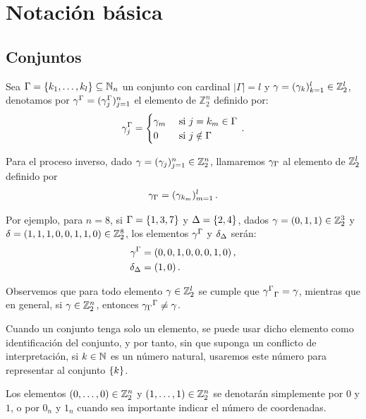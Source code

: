 \section{Notación básica}
\subsection{Conjuntos}
Sea $\Gamma=\{k_1,\dots,k_l\}\subseteq\mathbb{N}_n$ un conjunto con cardinal $|\Gamma|=l$ y $\gamma=(\gamma_{k})_{k=1}^l\in\mathbb{Z}_2^l$, denotamos por ${\gamma}^{\Gamma}=({\gamma}^{\Gamma}_j)_{j=1}^n$ el elemento de $\mathbb{Z}_2^n$ definido por:
\begin{equation}
  \label{eq:vector_extendido}
  {\gamma}^{\Gamma}_j=
  \begin{cases}
    \gamma_m & \text{ si } j =k_m\in\Gamma \\
    0        & \text{ si }j\notin\Gamma
  \end{cases}\,.
\end{equation}

Para el proceso inverso, dado $\gamma=(\gamma_{j})_{j=1}^n\in\mathbb{Z}_2^n$, llamaremos ${\gamma}_{\Gamma}$ al elemento de $\mathbb{Z}_2^l$ definido por
\begin{equation}
  \label{eq:vector_reducido}
  {\gamma}_{\Gamma}=(\gamma_{k_m})_{m=1}^l\,.
\end{equation}


Por ejemplo, para $n=8$, si $\Gamma = \{1, 3, 7\}$ y $\Delta = \{2, 4\}$, dados $\gamma = (0,1,1)\in\mathbb{Z}_2^3$ y $\delta = (1, 1, 1, 0, 0, 1, 1, 0)\in\mathbb{Z}_2^8$, los elementos ${\gamma}^{\Gamma}$ y ${\delta}_{\Delta}$ serán:
\begin{align*}
  {\gamma}^{\Gamma} & = (0, 0, 1, 0, 0, 0, 1, 0)\,, \\
  {\delta}_{\Delta} & = (1, 0)\,.
\end{align*}


Observemos que para todo elemento $\gamma\in\mathbb{Z}_2^l$ se cumple que ${{\gamma}^{\Gamma}}_{\Gamma}=\gamma$, mientras que en general, si $\gamma\in\mathbb{Z}_2^n$, entonces ${{\gamma}_{\Gamma}}^{\Gamma}\neq\gamma$.

Cuando un conjunto tenga solo un elemento, se puede usar dicho elemento como identificación del conjunto, y por tanto, sin que suponga un conflicto de interpretación, si $k\in\mathbb{N}$ es un número natural, usaremos este número para representar al conjunto $\{k\}$.

Los elementos $(0,\dots,0)\in\mathbb{Z}_2^n$ y $(1,\dots,1)\in\mathbb{Z}_2^n$ se denotarán simplemente por $0$ y $1$, o por $0_n$ y $1_n$ cuando sea importante indicar el número de coordenadas.
